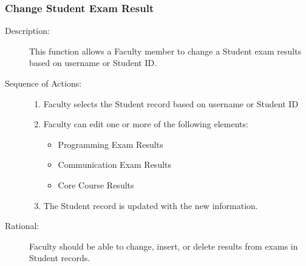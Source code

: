    \subsubsection{\large Change Student Exam Result} 
   \begin{boxed} %
      \begin{description}
         \item[Description:\label{desc:change_result}]
      This function allows a Faculty member to change a Student exam results
      based on username or Student ID.
         
            \item[Sequence of Actions:]\hspace{10cm}
         \begin{enumerate}
               
            \item Faculty selects the Student record based on username or
               Student ID
            \item Faculty can edit one or more of the following elements:
            \begin{itemize}
               \item Programming Exam Results
               \item Communication Exam Results
               \item Core Course Results
            \end{itemize}
         \item The Student record is updated with the new information.
      \end{enumerate}

            \item[Rational:]
         Faculty should be able to change, insert, or delete results from exams
         in Student records.
      \end{description}
   \end{boxed} %

